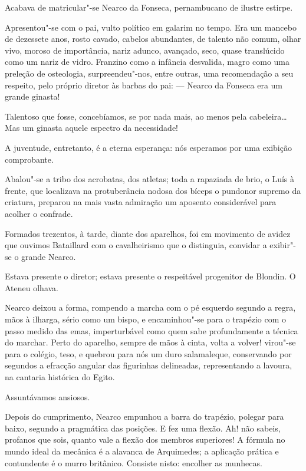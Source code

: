 Acabava de matricular"-se Nearco da Fonseca, pernambucano de ilustre estirpe.

Apresentou"-se com o pai, vulto político em galarim no tempo. Era um
mancebo de dezessete anos, rosto cavado, cabelos abundantes, de talento
não comum, olhar vivo, moroso de importância, nariz adunco, avançado,
seco, quase translúcido como um nariz de vidro. Franzino como a
infância desvalida, magro como uma preleção de osteologia,
surpreendeu"-nos, entre outras, uma recomendação a seu respeito, pelo
próprio diretor às barbas do pai: --- Nearco da Fonseca era um grande
ginasta! 

Talentoso que fosse, concebíamos, se por nada mais, ao menos
pela cabeleira\ldots{} Mas um ginasta aquele espectro da necessidade! 

A juventude, entretanto, é a eterna esperança: nós esperamos por uma
exibição comprobante. 

Abalou"-se a tribo dos acrobatas, dos atletas;
toda a rapaziada de brio, o Luís à frente, que localizava na
protuberância nodosa dos bíceps o pundonor supremo da criatura,
preparou na mais vasta admiração um aposento considerável para acolher
o confrade. 

Formados trezentos, à tarde, diante dos aparelhos, foi em
movimento de avidez que ouvimos Bataillard com o cavalheirismo que o
distinguia, convidar a exibir"-se o grande Nearco. 

Estava presente o
diretor; estava presente o respeitável progenitor de Blondin. O Ateneu
olhava. 

Nearco deixou a forma, rompendo a marcha com o pé esquerdo
segundo a regra, mãos à ilharga, sério como um bispo, e encaminhou"-se
para o trapézio com o passo medido das emas, imperturbável 
como quem sabe profundamente a técnica do marchar. Perto
do aparelho, sempre de mãos à cinta, volta a volver! virou"-se para o
colégio, teso, e quebrou para nós um duro salamaleque, conservando por
segundos a efracção angular das figurinhas delineadas, representando a
lavoura, na cantaria histórica do Egito. 

Assuntávamos ansiosos. 

Depois do cumprimento, Nearco empunhou a barra do trapézio, polegar para
baixo, segundo a pragmática das posições. E fez uma flexão. Ah! não
sabeis, profanos que sois, quanto vale a flexão dos membros superiores!
A fórmula no mundo ideal da mecânica é a alavanca de Arquimedes; a
aplicação prática e contundente é o murro britânico. Consiste nisto:
encolher as munhecas. 

